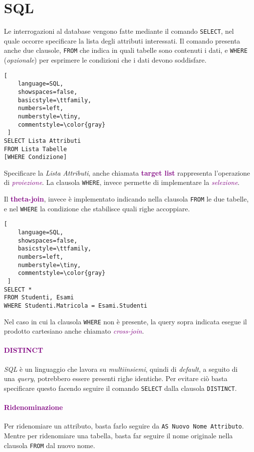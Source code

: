 \section{SQL}
Le interrogazioni al database vengono fatte mediante il comando
\verb|SELECT|, nel quale occorre specificare la lista degli attributi interessati.
Il comando presenta anche due clausole, \verb|FROM| che indica in quali tabelle
sono contenuti i dati, e \verb|WHERE| (\emph{opzionale}) per esprimere le condizioni che i dati
devono soddisfare.
\begin{lstlisting}[
    language=SQL,
    showspaces=false,
    basicstyle=\ttfamily,
    numbers=left,
    numberstyle=\tiny,
    commentstyle=\color{gray}
 ]
SELECT Lista Attributi
FROM Lista Tabelle
[WHERE Condizione]
\end{lstlisting}

Specificare la \emph{Lista Attributi}, anche chiamata \textbf{\textcolor{purple}{target list}}
rappresenta l'operazione di \emph{\textcolor{purple}{proiezione}}.
La clausola \verb|WHERE|, invece permette di implementare la \emph{\textcolor{purple}{selezione}}.

Il \textbf{\textcolor{purple}{theta-join}}, invece è implementato indicando nella clausola
\verb|FROM| le due tabelle, e nel \verb|WHERE| la condizione che stabilisce quali righe accoppiare.

\begin{lstlisting}[
    language=SQL,
    showspaces=false,
    basicstyle=\ttfamily,
    numbers=left,
    numberstyle=\tiny,
    commentstyle=\color{gray}
 ]
SELECT *
FROM Studenti, Esami
WHERE Studenti.Matricola = Esami.Studenti
\end{lstlisting}

Nel caso in cui la clausola \verb|WHERE| non è presente, la query sopra indicata esegue il prodotto cartesiano
anche chiamato \emph{\textcolor{purple}{cross-join}}.

\paragraph{\textcolor{purple}{DISTINCT}} \emph{SQL} è un linguaggio che
lavora su \emph{multiinsiemi}, quindi di \emph{default}, a seguito di una \emph{query},
potrebbero essere presenti righe identiche. Per evitare ciò basta specificare questo facendo seguire il comando
\verb|SELECT| dalla clausola \verb|DISTINCT|.

\paragraph{\textcolor{purple}{Ridenominazione}} Per ridenomiare un attributo, basta farlo seguire da
\verb|AS Nuovo Nome Attributo|.
Mentre per ridenomiare una tabella, basta far seguire il nome originale nella clausola \verb|FROM| dal nuovo nome.

